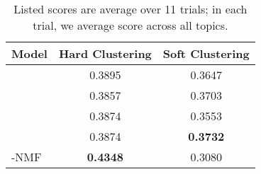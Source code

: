 \documentclass[twocolumn,10pt]{article}
\begin{document}
\begin{table}[tb]
\footnotesize
    \centering
{ \renewcommand{\arraystretch}{1.15}
\begin{tabular}{ l  c  c}
            \hline
            Model & Hard Clustering & Soft Clustering \\
            \hline
             &0.3895 &0.3647 \\
             &0.3857 &0.3703 \\
             &0.3874 &0.3553 \\
             &0.3874 &\textbf{0.3732} \\
            -NMF &\textbf{0.4348} &0.3080 \\
\hline
\end{tabular}}
\caption{Listed scores are average over 11 trials; in each trial, we average score  across all topics.}
\label{table:model_clustering}
\end{table}
\end{document}
